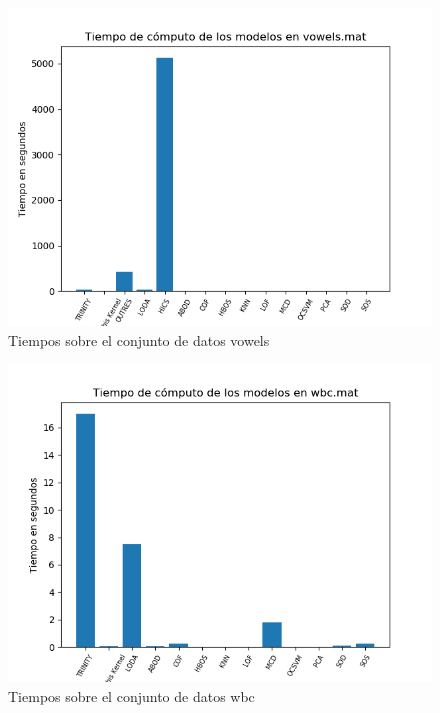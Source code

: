 \begin{figure}[H]
	\centering
	\includegraphics[scale=0.7]{imagenes/imgs-exp1/times/vowels}
	\caption{Tiempos sobre el conjunto de datos vowels}
	\label{vowels_times}
\end{figure}

\begin{figure}[H]
	\centering
	\includegraphics[scale=0.7]{imagenes/imgs-exp1/times/wbc}
	\caption{Tiempos sobre el conjunto de datos wbc}
	\label{wbc_times}
\end{figure}

